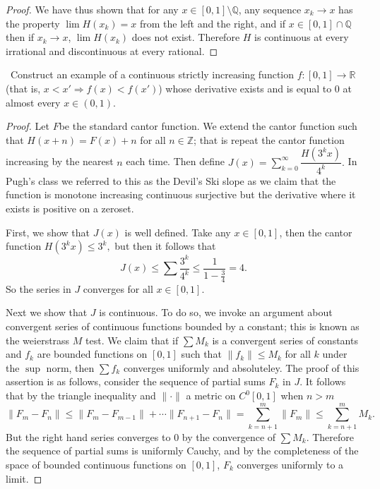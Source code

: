 \documentclass[11pt]{amsart}
\theoremstyle{definition}
\numberwithin{theorem}{section}
\numberwithin{definition}{section}
\numberwithin{equation}{section}
\def\reals{{\mathbb R}}
\begin{document}
\begin{proof}
We have thus shown that for any $x \in [0,1] \setminus \mathbb{Q}$, any sequence $x_k \to x$ has the property $\lim H(x_k) = x$ from the left and the right, and if $x \in [0,1] \cap \mathbb{Q}$ then if $x_k \to x$, $\lim H(x_k)$ does not exist. Therefore $H$ is continuous at every irrational and discontinuous at every rational.
\end{proof}


\medskip {}\
Construct an example of a continuous strictly increasing function $f:[0,1]\to\reals$
(that is, $x<x'\Rightarrow f(x)<f(x')$)
whose derivative exists and is equal to $0$ at almost every $x\in(0,1)$.
\begin{proof}
	Let $F$be the standard cantor function. We extend the cantor function such that $H(x+n) = F(x) +n$ for all $n\in \mathbb{Z}$; that is repeat the cantor function increasing by the nearest $n$ each time. Then define $J(x) = \sum_{k=0}^\infty \dfrac{H(3^k x)}{4^k}.$ In Pugh's class we referred to this as the Devil's Ski slope as we claim that the function is monotone increasing continuous surjective but the derivative where it exists is positive on a zeroset.

	First, we show that $J(x)$ is well defined. Take any $x \in [0,1]$, then the cantor function $H(3^kx) \leq 3^k,$ but then it follows that
	\begin{equation*}
		J(x) \leq \sum \frac{3^k}{4^k} \leq \frac{1}{1 - \frac{3}{4}} = 4.
	\end{equation*}
	So the series in $J$ converges for all $x \in [0,1].$

	Next we show that $J$ is continuous. To do so, we invoke an argument about convergent series of continuous functions bounded by a constant; this is known as the weierstrass $M$ test. We claim  that if $\sum M_k$ is a convergent series of constants and $f_k$ are bounded functions on $[0,1]$ such that $\|f_k\| \leq M_k$ for all $k$ under the $\sup$ norm, then $\sum f_k$ converges uniformly and absoluteley. The proof of this assertion is as follows, consider the sequence of partial sums $F_k$ in $J$. It follows that by the triangle inequality and $\|\cdot\|$ a metric on $C^0[0,1]$ when $n > m$
	\begin{equation*} 
		\|F_m - F_n\| \leq \|F_m - F_{m-1} \| + \cdots \|F_{n+1} - F_n\| = \sum_{k=n+1}^m \|F_m\| \leq \sum_{k=n+1}^m M_k.
	\end{equation*}
	But the right hand series converges to $0$ by the convergence of $\sum M_k$. Therefore the sequence of partial sums is uniformly Cauchy, and by the completeness of the space of bounded continuous functions on $[0,1]$, $F_k$ converges uniformly to a limit.


\end{proof}
\end{document}
